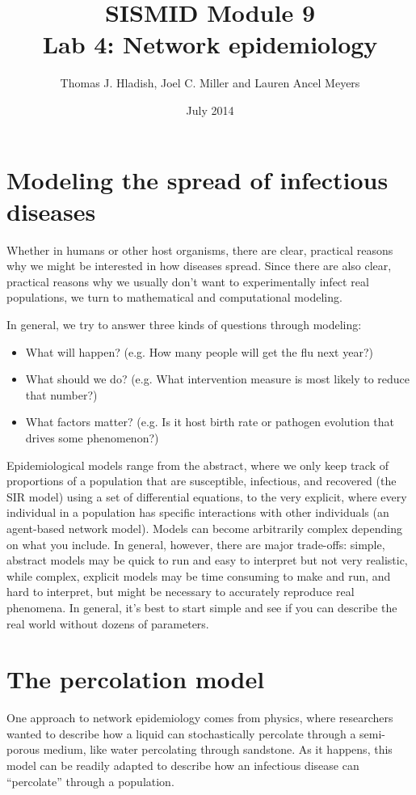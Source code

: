 \documentclass{article}
\begin{document}
\title{SISMID Module 9\\Lab 4: Network epidemiology}
\author{Thomas J. Hladish, Joel C. Miller and Lauren Ancel Meyers}
\date{July 2014}
\maketitle


\section*{Modeling the spread of infectious diseases}
Whether in humans or other host organisms, there are clear, practical reasons
why we might be interested in how diseases spread.  Since there are also clear,
practical reasons why we usually don't want to experimentally infect real
populations, we turn to mathematical and computational modeling.

In general, we try to answer three kinds of questions through modeling:
\begin{itemize}
 \item What will happen? (e.g. How many people will get the flu next year?)
 \item What should we do? (e.g. What intervention measure is most likely to
reduce that number?)
 \item What factors matter? (e.g. Is it host birth rate or pathogen evolution
that drives some phenomenon?)
\end{itemize}

Epidemiological models range from the abstract, where we only keep track of
proportions of a population that are susceptible, infectious, and recovered (the
SIR model) using a set of differential equations, to the very explicit, where
every individual in a population has specific interactions with other
individuals (an agent-based network model).  Models can become arbitrarily
complex depending on what you include.  In general, however, there are major
trade-offs: simple, abstract models may be quick to run and easy to interpret but
not very realistic, while complex, explicit models may be time consuming to make
and run, and hard to interpret, but might be necessary to accurately reproduce
real phenomena.  In general, it's best to start simple and see if you can
describe the real world without dozens of parameters.

\section*{The percolation model}
\label{perc}
One approach to network epidemiology comes from physics, where researchers
wanted to describe how a liquid can stochastically percolate through a
semi-porous medium, like water percolating through sandstone.  As it happens,
this model can be readily adapted to describe how an infectious disease can
``percolate'' through a population.
\end{document}
